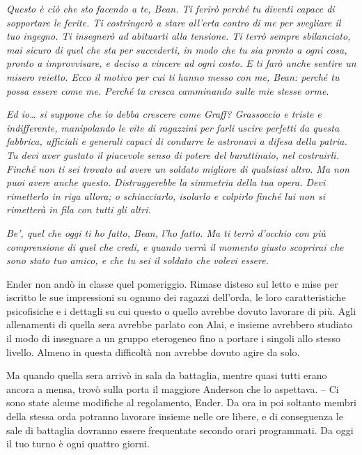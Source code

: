 \emph{{Questo è ciò che sto facendo a te, Bean. Ti ferirò perché tu
		diventi capace di sopportare le ferite. Ti costringerò a stare all'erta
		contro di me per svegliare il tuo ingegno. Ti insegnerò ad abituarti
		alla tensione. Ti terrò sempre sbilanciato, mai sicuro di quel che sta
		per succederti, in modo che tu sia pronto a ogni cosa, pronto a
		improvvisare, e deciso a vincere ad ogni costo. E ti farò anche sentire
		un misero reietto. Ecco il motivo per cui ti hanno messo con me, Bean:
		perché tu possa essere come me. Perché tu cresca camminando sulle mie
		stesse orme.}}

\emph{{Ed io\ldots{} si suppone che io debba crescere come Graff?
		Grassoccio e triste e indifferente, manipolando le vite di ragazzini per
		farli uscire perfetti da questa fabbrica, ufficiali e generali capaci di
		condurre le astronavi a difesa della patria. Tu devi aver gustato il
		piacevole senso di potere del burattinaio, nel costruirli. Finché non ti
		sei trovato ad avere un soldato migliore di qualsiasi altro. Ma non puoi
		avere anche questo. Distruggerebbe la simmetria della tua opera. Devi
		rimetterlo in riga allora; o schiacciarlo, isolarlo e colpirlo finché
		lui non si rimetterà in fila con tutti gli altri.}}

\emph{{Be', quel che oggi ti ho fatto, Bean, l'ho fatto. Ma ti terrò
		d'occhio con più comprensione di quel che credi, e quando verrà il
		momento giusto scoprirai che sono stato tuo amico, e che tu sei il
		soldato che volevi essere.}}

{Ender non andò in classe quel pomeriggio. Rimase disteso sul letto e
	mise per iscritto le sue impressioni su ognuno dei ragazzi dell'orda, le
	loro caratteristiche psicofisiche e i dettagli su cui questo o quello
	avrebbe dovuto lavorare di più. Agli allenamenti di quella sera avrebbe
	parlato con Alai, e insieme avrebbero studiato il modo di insegnare a un
	gruppo eterogeneo fino a portare i singoli allo stesso livello. Almeno
	in questa difficoltà non avrebbe dovuto agire da solo.}

{Ma quando quella sera arrivò in sala da battaglia, mentre quasi tutti
	erano ancora a mensa, trovò sulla porta il maggiore Anderson che lo
	aspettava. -- Ci sono state alcune modifiche al regolamento, Ender. Da
	ora in poi soltanto membri della stessa orda potranno lavorare insieme
	nelle ore libere, e di conseguenza le sale di battaglia dovranno essere
	frequentate secondo orari programmati. Da oggi il tuo turno è ogni
	quattro giorni.}

